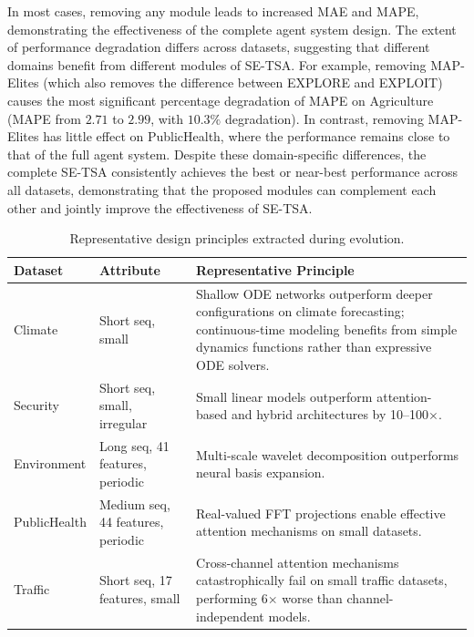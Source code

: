 In most cases, removing any module leads to increased MAE and MAPE, demonstrating the effectiveness of the complete agent system design. The extent of performance degradation differs across datasets, suggesting that different domains benefit from different modules of SE-TSA. For example, removing MAP-Elites (which also removes the difference between EXPLORE and EXPLOIT) causes the most significant percentage degradation of MAPE on Agriculture (MAPE from $2.71$ to $2.99$, with $10.3\%$ degradation). In contrast, removing MAP-Elites has little effect on PublicHealth, where the performance remains close to that of the full agent system. Despite these domain-specific differences, the complete SE-TSA consistently achieves the best or near-best performance across all datasets, demonstrating that the proposed modules can complement each other and jointly improve the effectiveness of SE-TSA.

\begin{nolinenumbers}
\begin{table}[htbp]
\centering
\caption{Representative design principles extracted during evolution.}
\label{tab:principles_by_domain}
\small
\setlength{\tabcolsep}{2pt}
\begin{tabular}{l>{\raggedright\arraybackslash}p{1.2cm}>{\raggedright\arraybackslash}p{4.5cm}}
\toprule
\textbf{Dataset} & \textbf{Attribute} & \textbf{Representative Principle} \\
\midrule
Climate & Short seq, small & Shallow ODE networks outperform deeper configurations on climate forecasting; continuous-time modeling benefits from simple dynamics functions rather than expressive ODE solvers. \\
\midrule
Security & Short seq, small, irregular & Small linear models outperform attention-based and hybrid architectures by 10--100$\times$. \\
\midrule
Environment & Long seq, 41 features, periodic & Multi-scale wavelet decomposition outperforms neural basis expansion. \\
\midrule
PublicHealth & Medium seq, 44 features, periodic & Real-valued FFT projections enable effective attention mechanisms on small datasets. \\
\midrule
Traffic & Short seq, 17 features, small & Cross-channel attention mechanisms catastrophically fail on small traffic datasets, performing 6$\times$ worse than channel-independent models. \\
\bottomrule
\end{tabular}
\end{table}
\end{nolinenumbers}

